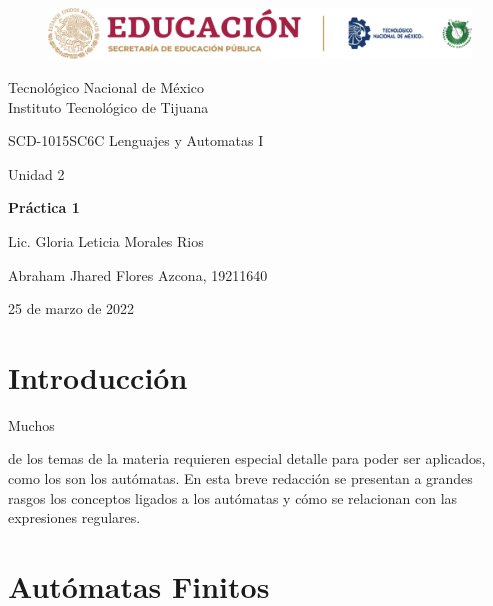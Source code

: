 \documentclass[stu, 12pt, letterpaper, donotrepeattitle, floatsintext, natbib]{apa7}
\begin{document}
    \begin{titlepage}
        \begin{figure}[ht]
            \centering
            \includegraphics[width=15cm]{logosITT.png}
        \end{figure}
        \centering
        {\Large Tecnológico Nacional de México\\Instituto Tecnológico de Tijuana\par}
        \vspace{1cm}
        {\Large SCD-1015SC6C Lenguajes y Automatas I\par}
        \vspace{1cm}
        {\Large Unidad 2\par}
        \vspace{1.5cm}
        {\Large\bfseries Práctica 1\par}
        \vspace{2cm}
        {\large Lic. Gloria Leticia Morales Rios\par}
        \vfill
            {\large Abraham Jhared Flores Azcona, 19211640\par}
        \vfill
        {\large 25 de marzo de 2022}
    \end{titlepage}

\renewcommand\contentsname{Contenido}
\tableofcontents

\newpage
\section{Introducción}
Muchos \begin{justifying}
    de los temas de la materia requieren especial detalle para poder ser aplicados, como los son los autómatas.
    En esta breve redacción se presentan a grandes rasgos los conceptos ligados a los autómatas y cómo se relacionan
    con las expresiones regulares.\par
    \end{justifying}
\vspace{\baselineskip}
\section{Autómatas Finitos}
\end{document}
